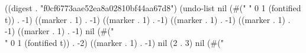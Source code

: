 
((digest . "f0cf6773aae52ea8a02810bf44aa67d8") (undo-list nil (#("
" 0 1 (fontified t)) . -1) ((marker . 1) . -1) ((marker . 1) . -1) ((marker . 1) . -1) ((marker . 1) . -1) ((marker . 1) . -1) nil (#("\\" 0 1 (fontified t)) . -2) ((marker . 1) . -1) nil (2 . 3) nil (#("%
%
%
